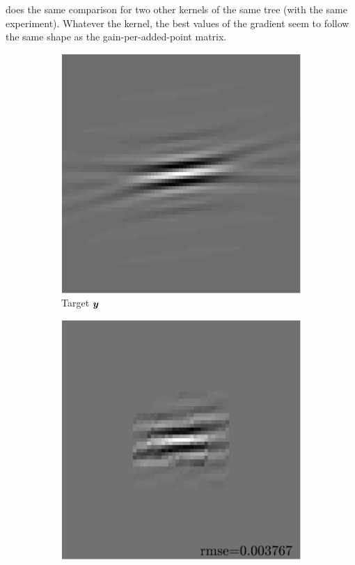 \noindent
{} does the same comparison for two other kernels of the same tree (with the same experiment). Whatever the kernel, the best values of the gradient seem to follow the same shape as the gain-per-added-point matrix. 

\begin{figure}[!h]\centering
	\begin{subfigure}[b]{0.22\textwidth}\centering
	\includegraphics[width=\textwidth]{figures/xp/tilted_n4/xp_128x128_sc2_angl4_K3_S3_node4_target.pdf}
	\caption{Target $\bm{y}$}
	\end{subfigure}
	\begin{subfigure}[b]{0.22\textwidth}\centering
	\includegraphics[width=\textwidth]{figures/xp/tilted_n4/xp_128x128_sc2_angl4_K3_S3_node4_approx.pdf}

\end{subfigure}
\end{figure}

